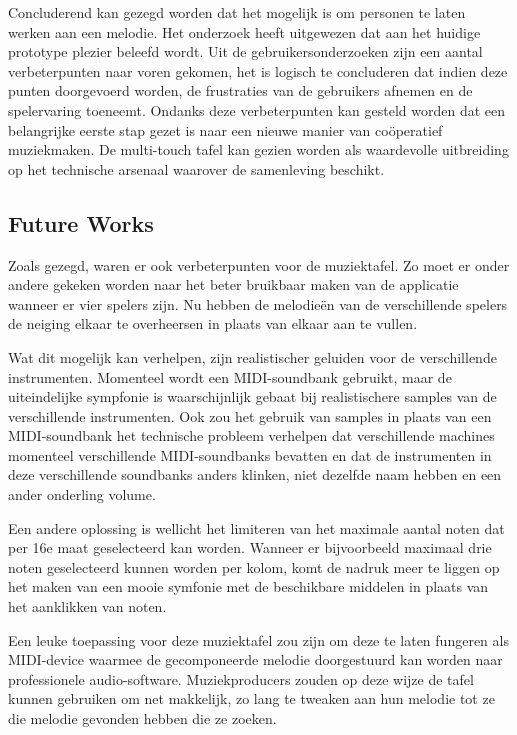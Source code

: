 \documentclass{acm}
\begin{document}
Concluderend kan gezegd worden dat het mogelijk is om personen te laten werken aan een melodie. Het onderzoek heeft uitgewezen dat aan het huidige prototype plezier beleefd wordt. Uit de gebruikersonderzoeken zijn een aantal verbeterpunten naar voren gekomen, het is logisch te concluderen dat indien deze punten doorgevoerd worden, de frustraties van de gebruikers afnemen en de spelervaring toeneemt. Ondanks deze verbeterpunten kan gesteld worden dat een belangrijke eerste stap gezet is naar een nieuwe manier van co\"operatief muziekmaken. De multi-touch tafel kan gezien worden als waardevolle uitbreiding op het technische arsenaal waarover de samenleving beschikt.


\subsection{Future Works}
Zoals gezegd, waren er ook verbeterpunten voor de muziektafel. Zo moet er onder andere gekeken worden naar het beter bruikbaar maken van de applicatie wanneer er vier spelers zijn. Nu hebben de melodie\"en van de verschillende spelers de neiging elkaar te overheersen in plaats van elkaar aan te vullen.

Wat dit mogelijk kan verhelpen, zijn realistischer geluiden voor de verschillende instrumenten. Momenteel wordt een MIDI-soundbank gebruikt, maar de uiteindelijke sympfonie is waarschijnlijk gebaat bij realistischere samples van de verschillende instrumenten. Ook zou het gebruik van samples in plaats van een MIDI-soundbank het technische probleem verhelpen dat verschillende machines momenteel verschillende MIDI-soundbanks bevatten en dat de instrumenten in deze verschillende soundbanks anders klinken, niet dezelfde naam hebben en een ander onderling volume.

Een andere oplossing is wellicht het limiteren van het maximale aantal noten dat per 16e maat geselecteerd kan worden. Wanneer er bijvoorbeeld maximaal drie noten geselecteerd kunnen worden per kolom, komt de nadruk meer te liggen op het maken van een mooie symfonie met de beschikbare middelen in plaats van het aanklikken van noten.

Een leuke toepassing voor deze muziektafel zou zijn om deze te laten fungeren als MIDI-device waarmee de gecomponeerde melodie doorgestuurd kan worden naar professionele audio-software. Muziekproducers zouden op deze wijze de tafel kunnen gebruiken om net makkelijk, zo lang te tweaken aan hun melodie tot ze die melodie gevonden hebben die ze zoeken.
\end{document}
